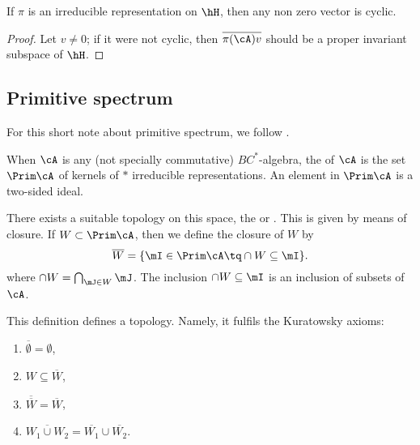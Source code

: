 \begin{lemma}
	If $\pi$ is an irreducible representation on $\hH$, then any non zero vector is cyclic.
\end{lemma}

\begin{proof}
	Let $v\neq 0$; if it were not cyclic, then $\overline{ \pi(\cA)v}$ should be a proper invariant  subspace of $\hH$.
\end{proof}

\subsection{Primitive spectrum}
For this short note about primitive spectrum, we follow \cite{Landi}.

When $\cA$ is any (not specially commutative) $BC^*$-algebra, the  of $\cA$ is the set $\Prim\cA$ of kernels of $*$ irreducible representations. An element in $\Prim\cA$ is a two-sided ideal.

There exists a suitable topology on this space, the  or . This is given by means of closure. If $W\subset\Prim\cA$, then we define the closure of $W$ by
\begin{equation}
	\overline{ W }=\{ \mI\in\Prim\cA\tq \cap W\subseteq \mI \}.
\end{equation}
where $\cap W=\bigcap_{\mJ\in W}\mJ$. The inclusion $\cap W\subseteq\mI$ is an inclusion of subsets of $\cA$.

\begin{proposition}
	This definition defines a topology. Namely, it fulfils the Kuratowsky axioms:

	\begin{enumerate}
		\item\label{enu802i} $\overline{ \emptyset }=\emptyset$,
		\item \label{enu802ii} $W\subseteq\overline{ W }$,
		\item \label{enu802iii} $\overline{ \overline{ W } }=\overline{ W }$,
		\item \label{enu802iv} $\overline{ W_1\cup W_2 }=\overline{ W_1 }\cup\overline{ W_2 }$.
	\end{enumerate}
\end{proposition}

